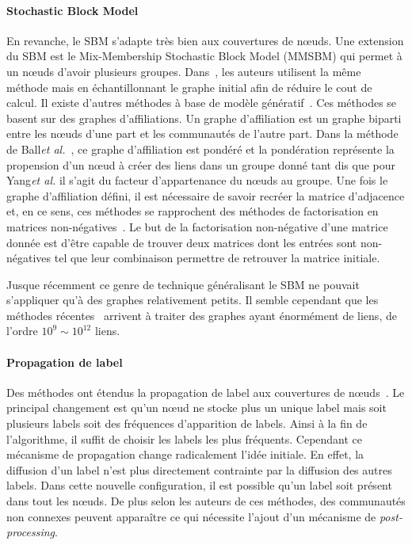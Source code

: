 \paragraph{Stochastic Block Model}
En revanche, le SBM s'adapte très bien aux couvertures de n\oe uds.
Une extension du SBM est le Mix-Membership Stochastic Block Model (MMSBM)\cite{Airoldi2008} qui permet à un n\oe uds d'avoir plusieurs groupes.
Dans~\cite{Gopalan2013a}, les auteurs utilisent la même méthode mais en échantillonnant le graphe initial afin de réduire le cout de calcul.
Il existe d'autres méthodes à base de modèle génératif~\cite{Ball2011,Yang2013}.
Ces méthodes se basent sur des graphes d'affiliations\cite{BreigerRonald1974}.
Un graphe d'affiliation est un graphe biparti entre les n\oe uds d'une part et les communautés de l'autre part.
Dans la méthode de Ball\emph{et al.}~\cite{Ball2011}, ce graphe d'affiliation est pondéré et la pondération représente la propension d'un n\oe ud à créer des liens dans un groupe donné tant dis que pour Yang\emph{et al.} il s'agit du facteur d'appartenance du n\oe uds au groupe.
Une fois le graphe d'affiliation défini, il est nécessaire de savoir recréer la matrice d'adjacence et, en ce sens, ces méthodes se rapprochent des méthodes de factorisation en matrices non-négatives~\cite{Lee1999}.
Le but de la factorisation non-négative d'une matrice donnée est d'être capable de trouver deux matrices dont les entrées sont non-négatives tel que leur combinaison permettre de retrouver la matrice initiale.

Jusque récemment ce genre de technique généralisant le SBM ne pouvait s'appliquer qu'à des graphes relativement petits.
Il semble cependant que les méthodes récentes~\cite{Gopalan2013a, Yang2013} arrivent à traiter des graphes ayant énormément de liens, de l'ordre $10^{9}\sim10^{12}$ liens.



\paragraph{Propagation de label}
Des méthodes ont étendus la propagation de label aux couvertures de n\oe uds~\cite{Gregory2010,Xie2011}.
Le principal changement est qu'un n\oe ud ne stocke plus un unique label mais soit plusieurs labels soit des fréquences d'apparition de labels.
Ainsi à la fin de l'algorithme, il suffit de choisir les labels les plus fréquents.
Cependant ce mécanisme de propagation change radicalement l'idée initiale.
En effet, la diffusion d'un label n'est plus directement contrainte par la diffusion des autres labels.
Dans cette nouvelle configuration, il est possible qu'un label soit présent dans tout les n\oe uds.
De plus selon les auteurs de ces méthodes, des communautés non connexes peuvent apparaître ce qui nécessite l’ajout d’un mécanisme de \emph{post-processing}.



